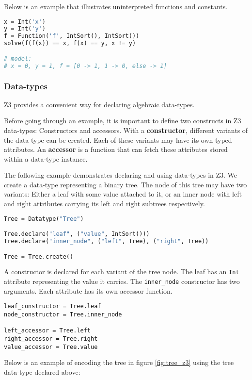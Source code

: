 Below is an example that illustrates uninterpreted functions and constants.

\begin{lstlisting}[language=python]
x = Int('x')
y = Int('y')
f = Function('f', IntSort(), IntSort())
solve(f(f(x)) == x, f(x) == y, x != y)

# model:
# x = 0, y = 1, f = [0 -> 1, 1 -> 0, else -> 1]
\end{lstlisting}

\subsubsection{Data-types}
Z3 provides a convenient way for declaring algebraic data-types.

Before going through an example, it is important to define two constructs in Z3 data-types: Constructors and accessors. With a \textbf{constructor}, different variants of the data-type can be created. Each of these variants may have its own typed attributes. An \textbf{accessor} is a function that can fetch these attributes stored within a data-type instance.

The following example demonstrates declaring and using data-types in Z3. We create a data-type representing a binary tree. The node of this tree may have two variants: Either a leaf with some value attached to it, or an inner node with left and right attributes carrying its left and right subtrees respectively.

\begin{lstlisting}[language=python]
Tree = Datatype("Tree")

Tree.declare("leaf", ("value", IntSort()))
Tree.declare("inner_node", ("left", Tree), ("right", Tree))

Tree = Tree.create()
\end{lstlisting}

A constructor is declared for each variant of the tree node. The leaf has an \lstinline|Int| attribute representing the value it carries. The \lstinline|inner_node| constructor has two arguments. Each attribute has its own accessor function.

\begin{lstlisting}
leaf_constructor = Tree.leaf
node_constructor = Tree.inner_node

left_accessor = Tree.left
right_accessor = Tree.right
value_accessor = Tree.value
\end{lstlisting}

Below is an example of encoding the tree in figure \ref{fig:tree_z3} using the tree data-type declared above:

